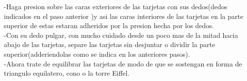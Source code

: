 \documentclass{article}
\begin{document}
    
    -Haga presion sobre las caras exteriores de las tarjetas  con sus dedos(dedos indicados en el paso anterior )y asi las caras interiores de las tarjetas en la parte superior de estas estaran adheridos por la presion hecha por los dedos.\\
   
    
    -Con su dedo pulgar, con mucho cuidado desde un poco mas de la mitad hacia abajo de las tarjetas, separe las tarjetas sin desjuntar o dividir la parte superior(adderiendolas como se indica en los anteriores pasos).\\
    
    
    -Ahora    trate de equilibrar las tarjetas de modo de que se sostengan en forma de triangulo equilatero, cono o la torre Eiffel.\\
\end{document}
